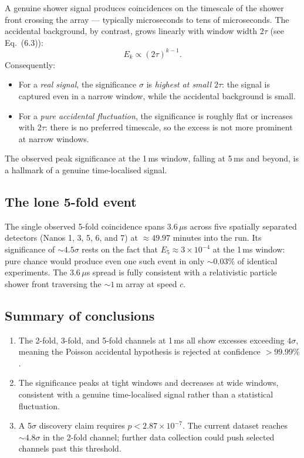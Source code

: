 \documentclass[12pt]{article}
\theoremstyle{definition}
\theoremstyle{remark}
\newenvironment{keybox}[1]{%
  \begin{tcolorbox}[colback=blue!5!white, colframe=blue!40!black,
      fonttitle=\bfseries, title={#1}, breakable]%
}{%
  \end{tcolorbox}%
}
\newcommand{\Eacc}{E}
\newcommand{\nsig}{\sigma}
\begin{document}
A genuine shower signal produces coincidences on the timescale of the
shower front crossing the array — typically microseconds to tens of
microseconds.  The accidental background, by contrast, grows linearly
with window width $2\tau$ (see Eq.~(6.3)):
\[
  \Eacc_k \propto (2\tau)^{k-1}.
\]
Consequently:
\begin{itemize}
  \item For a \emph{real signal}, the significance $\nsig$ is
        \emph{highest at small $2\tau$}: the signal is captured even in
        a narrow window, while the accidental background is small.
  \item For a \emph{pure accidental fluctuation}, the significance is
        roughly flat or increases with $2\tau$: there is no preferred
        timescale, so the excess is not more prominent at narrow windows.
\end{itemize}
The observed peak significance at the 1\,ms window, falling at 5\,ms
and beyond, is a hallmark of a genuine time-localised signal.

\subsection{The lone 5-fold event}

The single observed 5-fold coincidence spans 3.6\,$\mu$s across
five spatially separated detectors (Nanos 1, 3, 5, 6, and 7) at
$\approx 49.97$ minutes into the run.  Its significance of
$\sim 4.5\sigma$ rests on the fact that $\Eacc_5 \approx 3\times
10^{-4}$ at the 1\,ms window: pure chance would produce even one such
event in only $\sim 0.03\%$ of identical experiments.  The 3.6\,$\mu$s
spread is fully consistent with a relativistic particle shower front
traversing the $\sim 1$\,m array at speed $c$.

\subsection{Summary of conclusions}

\begin{keybox}{Key statistical conclusions}
  \begin{enumerate}
    \item The 2-fold, 3-fold, and 5-fold channels at 1\,ms all show
          excesses exceeding $4\sigma$, meaning the Poisson accidental
          hypothesis is rejected at confidence $> 99.99\%$.
    \item The significance peaks at tight windows and decreases at wide
          windows, consistent with a genuine time-localised signal rather
          than a statistical fluctuation.
    \item A 5$\sigma$ discovery claim requires $p < 2.87\times10^{-7}$.
          The current dataset reaches $\sim 4.8\sigma$ in the 2-fold
          channel; further data collection could push selected channels
          past this threshold.
  \end{enumerate}
\end{keybox}
\end{document}
